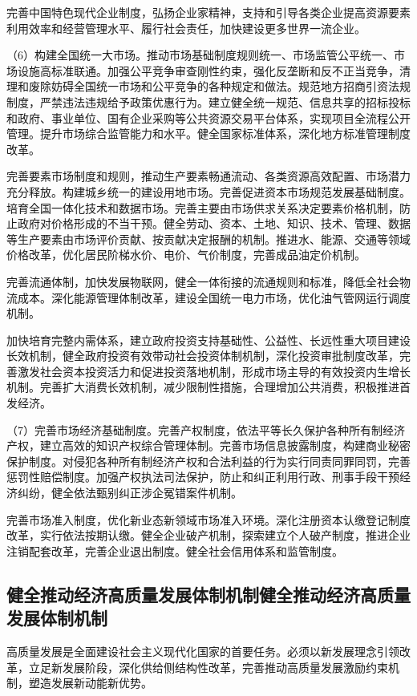     完善中国特色现代企业制度，弘扬企业家精神，支持和引导各类企业提高资源要素利用效率和经营管理水平、履行社会责任，加快建设更多世界一流企业。

    （6）构建全国统一大市场。推动市场基础制度规则统一、市场监管公平统一、市场设施高标准联通。加强公平竞争审查刚性约束，强化反垄断和反不正当竞争，清理和废除妨碍全国统一市场和公平竞争的各种规定和做法。规范地方招商引资法规制度，严禁违法违规给予政策优惠行为。建立健全统一规范、信息共享的招标投标和政府、事业单位、国有企业采购等公共资源交易平台体系，实现项目全流程公开管理。提升市场综合监管能力和水平。健全国家标准体系，深化地方标准管理制度改革。

    完善要素市场制度和规则，推动生产要素畅通流动、各类资源高效配置、市场潜力充分释放。构建城乡统一的建设用地市场。完善促进资本市场规范发展基础制度。培育全国一体化技术和数据市场。完善主要由市场供求关系决定要素价格机制，防止政府对价格形成的不当干预。健全劳动、资本、土地、知识、技术、管理、数据等生产要素由市场评价贡献、按贡献决定报酬的机制。推进水、能源、交通等领域价格改革，优化居民阶梯水价、电价、气价制度，完善成品油定价机制。

    完善流通体制，加快发展物联网，健全一体衔接的流通规则和标准，降低全社会物流成本。深化能源管理体制改革，建设全国统一电力市场，优化油气管网运行调度机制。

    加快培育完整内需体系，建立政府投资支持基础性、公益性、长远性重大项目建设长效机制，健全政府投资有效带动社会投资体制机制，深化投资审批制度改革，完善激发社会资本投资活力和促进投资落地机制，形成市场主导的有效投资内生增长机制。完善扩大消费长效机制，减少限制性措施，合理增加公共消费，积极推进首发经济。

    （7）完善市场经济基础制度。完善产权制度，依法平等长久保护各种所有制经济产权，建立高效的知识产权综合管理体制。完善市场信息披露制度，构建商业秘密保护制度。对侵犯各种所有制经济产权和合法利益的行为实行同责同罪同罚，完善惩罚性赔偿制度。加强产权执法司法保护，防止和纠正利用行政、刑事手段干预经济纠纷，健全依法甄别纠正涉企冤错案件机制。

    完善市场准入制度，优化新业态新领域市场准入环境。深化注册资本认缴登记制度改革，实行依法按期认缴。健全企业破产机制，探索建立个人破产制度，推进企业注销配套改革，完善企业退出制度。健全社会信用体系和监管制度。

    \subsection{健全推动经济高质量发展体制机制健全推动经济高质量发展体制机制}

    高质量发展是全面建设社会主义现代化国家的首要任务。必须以新发展理念引领改革，立足新发展阶段，深化供给侧结构性改革，完善推动高质量发展激励约束机制，塑造发展新动能新优势。


